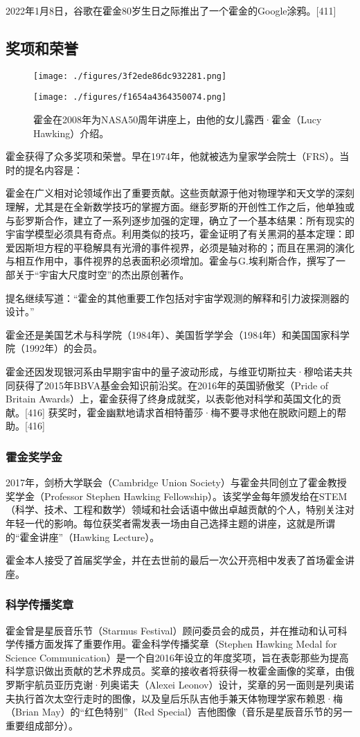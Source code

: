 2022年1月8日，谷歌在霍金80岁生日之际推出了一个霍金的Google涂鸦。[411]
\subsection{奖项和荣誉}
\begin{figure}[ht]
\centering
\texttt{[image: ./figures/3f2ede86dc932281.png]}
\caption{} \label{fig_HJ_10}
\end{figure}
\begin{figure}[ht]
\centering
\texttt{[image: ./figures/f1654a4364350074.png]}
\caption{霍金在2008年为NASA50周年讲座上，由他的女儿露西·霍金（Lucy Hawking）介绍。} \label{fig_HJ_11}
\end{figure}
霍金获得了众多奖项和荣誉。早在1974年，他就被选为皇家学会院士（FRS）。当时的提名内容是：

霍金在广义相对论领域作出了重要贡献。这些贡献源于他对物理学和天文学的深刻理解，尤其是在全新数学技巧的掌握方面。继彭罗斯的开创性工作之后，他单独或与彭罗斯合作，建立了一系列逐步加强的定理，确立了一个基本结果：所有现实的宇宙学模型必须具有奇点。利用类似的技巧，霍金证明了有关黑洞的基本定理：即爱因斯坦方程的平稳解具有光滑的事件视界，必须是轴对称的；而且在黑洞的演化与相互作用中，事件视界的总表面积必须增加。霍金与G.埃利斯合作，撰写了一部关于“宇宙大尺度时空”的杰出原创著作。

提名继续写道：“霍金的其他重要工作包括对宇宙学观测的解释和引力波探测器的设计。”

霍金还是美国艺术与科学院（1984年）、美国哲学学会（1984年）和美国国家科学院（1992年）的会员。

霍金还因发现银河系由早期宇宙中的量子波动形成，与维亚切斯拉夫·穆哈诺夫共同获得了2015年BBVA基金会知识前沿奖。在2016年的英国骄傲奖（Pride of Britain Awards）上，霍金获得了终身成就奖，以表彰他对科学和英国文化的贡献。[416] 获奖时，霍金幽默地请求首相特蕾莎·梅不要寻求他在脱欧问题上的帮助。[416]
\subsubsection{霍金奖学金}  
2017年，剑桥大学联会（Cambridge Union Society）与霍金共同创立了霍金教授奖学金（Professor Stephen Hawking Fellowship）。该奖学金每年颁发给在STEM（科学、技术、工程和数学）领域和社会话语中做出卓越贡献的个人，特别关注对年轻一代的影响。每位获奖者需发表一场由自己选择主题的讲座，这就是所谓的“霍金讲座”（Hawking Lecture）。  

霍金本人接受了首届奖学金，并在去世前的最后一次公开亮相中发表了首场霍金讲座。  
\subsubsection{科学传播奖章} 
霍金曾是星辰音乐节（Starmus Festival）顾问委员会的成员，并在推动和认可科学传播方面发挥了重要作用。霍金科学传播奖章（Stephen Hawking Medal for Science Communication）是一个自2016年设立的年度奖项，旨在表彰那些为提高科学意识做出贡献的艺术界成员。奖章的接收者将获得一枚霍金画像的奖章，由俄罗斯宇航员亚历克谢·列奥诺夫（Alexei Leonov）设计，奖章的另一面则是列奥诺夫执行首次太空行走时的图像，以及皇后乐队吉他手兼天体物理学家布赖恩·梅（Brian May）的“红色特别”（Red Special）吉他图像（音乐是星辰音乐节的另一重要组成部分）。  

